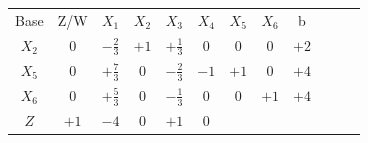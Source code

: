 \documentclass{beamer}
\begin{document}
\begin{frame}
{\begin{table}
\begin{tabular}{c c c c c c c c c c c c}
			\end{tabular}
		\end{table}			
	}
	{
		\begin{table}		
			\begin{tabular}{c c c c c c c c c c c c}
				\cline{1-8} 
				\cellcolor{blue!100} \color{white} \scriptsize Base 
				&\cellcolor{blue!100} \color{white} \scriptsize Z/W
				&\cellcolor{blue!100} \color{white} $\scriptstyle X_1$ 
				&\cellcolor{blue!100} \color{red} $\scriptstyle X_2$ 
				&\cellcolor{blue!100} \color{white}   $\scriptstyle X_3$ 
				&\cellcolor{blue!100} \color{white} $\scriptstyle X_4$ 
				&\cellcolor{blue!100} \color{red}   $\scriptstyle X_5$ 
				&\cellcolor{blue!100} \color{red}   $\scriptstyle X_6$ 
				&\cellcolor{blue!100} \color{white} \scriptsize b
				&
				&
				& \\
				\cellcolor{blue!100} \color{red} $\scriptstyle X_2$
				& \cellcolor{yellow!50} $\scriptstyle 0$
				& \cellcolor{gray!50} $\scriptstyle -\frac{2}{3}$
				& \cellcolor{yellow!50} $\scriptstyle +1$
				& \cellcolor{yellow!50} $\scriptstyle +\frac{1}{3}$
				& \cellcolor{yellow!50} $\scriptstyle 0$
				& \cellcolor{yellow!50} $\scriptstyle 0$
				& \cellcolor{yellow!50} $\scriptstyle 0$
				& \cellcolor{yellow!50} $\scriptstyle +2$ \\
			    \cellcolor{blue!100} \color{red} $\scriptstyle X_5$
				& \cellcolor{yellow!50} $\scriptstyle 0$
				& \cellcolor{gray!50} $\scriptstyle +\frac{7}{3}$
				& \cellcolor{yellow!50} $\scriptstyle 0$
				& \cellcolor{yellow!50} $\scriptstyle -\frac{2}{3}$			
				& \cellcolor{yellow!50} $\scriptstyle -1$
				& \cellcolor{yellow!50} $\scriptstyle +1$
				& \cellcolor{yellow!50} $\scriptstyle 0$ 
				& \cellcolor{yellow!50} $\scriptstyle +4$ \\
				\cellcolor{blue!100} \color{red} $\scriptstyle X_6$
				& \cellcolor{yellow!50} $\scriptstyle 0$
				& \cellcolor{gray!50} $\scriptstyle +\frac{5}{3}$
				& \cellcolor{yellow!50} $\scriptstyle 0$
				& \cellcolor{yellow!50} $\scriptstyle -\frac{1}{3}$
				& \cellcolor{yellow!50} $\scriptstyle 0$
				& \cellcolor{yellow!50} $\scriptstyle 0$
				& \cellcolor{yellow!50} $\scriptstyle +1$
				& \cellcolor{yellow!50} $\scriptstyle +4$ \\
				\cellcolor{blue!100} \color{white} $\scriptstyle Z$
				& \cellcolor{yellow!50} $\scriptstyle +1$
				& \cellcolor{gray!50} $\scriptstyle -4$
				& \cellcolor{yellow!50} $\scriptstyle 0$
				& \cellcolor{yellow!50} $\scriptstyle +1$
				& \cellcolor{yellow!50} $\scriptstyle 0$

\end{tabular}
\end{table}}
\end{frame}
\end{document}
